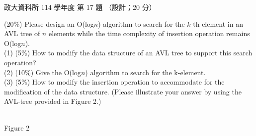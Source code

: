 \begin{pastexam}[label={px:nccu-114-dsa-17}]{政大資科所 114 學年度 第 17 題}
（設計；20 分）

(20\%) Please design an O(log$n$) algorithm to search for the $k$-th element in an AVL tree
of $n$ elements while the time complexity of insertion operation remains O(log$n$).\\
(1) (5\%) How to modify the data structure of an AVL tree to support this search operation?\\
(2) (10\%) Give the O(log$n$) algorithm to search for the k-element.\\
(3) (5\%) How to modify the insertion operation to accommodate for the modification of the
data structure. (Please illustrate your answer by using the AVL-tree provided in Figure 2.)
\begin{center}
\\
Figure 2
\end{center}
\end{pastexam}

